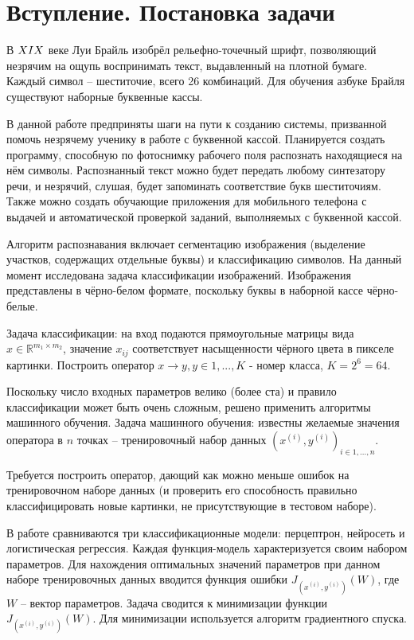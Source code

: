 \documentclass[main.tex]{subfiles}
\begin{document}
\section{Вступление. Постановка задачи}
В $\MakeUppercase{\romannumeral 19}$ веке Луи Брайль изобрёл рельефно-точечный шрифт, позволяющий незрячим на ощупь воспринимать текст, выдавленный на плотной бумаге. Каждый символ – шеститочие, всего 26 комбинаций. Для обучения азбуке Брайля существуют наборные буквенные кассы.

В данной работе предприняты шаги на пути к созданию системы, призванной помочь незрячему ученику в работе с буквенной кассой. Планируется создать программу, способную по фотоснимку рабочего поля распознать находящиеся на нём символы. Распознанный текст можно будет передать любому синтезатору речи, и незрячий, слушая, будет запоминать соответствие букв шеститочиям. Также можно создать обучающие приложения для мобильного телефона с выдачей и автоматической проверкой заданий, выполняемых с буквенной кассой.

Алгоритм распознавания включает сегментацию изображения (выделение участков, содержащих отдельные буквы) и классификацию символов. На данный момент исследована задача классификации изображений. Изображения представлены в чёрно-белом формате, поскольку буквы в наборной кассе чёрно-белые.

Задача классификации: на вход подаются прямоугольные матрицы вида $x \in \mathds{R} ^{m_1\times m_2}$, значение $x_{ij}$ соответствует насыщенности чёрного цвета в пикселе картинки. Построить оператор $x\rightarrow y, y \in 1, ..., K$ - номер класса, $K = 2^6 = 64$.

Поскольку число входных параметров велико (более ста) и правило классификации может быть очень сложным, решено применить алгоритмы машинного обучения. Задача машинного обучения: известны желаемые значения оператора в $n$ точках – тренировочный набор данных $(x^{(i)}, y^{(i)})_{i\in 1,...,n}$.

Требуется построить оператор, дающий как можно меньше ошибок на тренировочном наборе данных (и проверить его способность правильно классифицировать новые картинки, не присутствующие в тестовом наборе).

В работе сравниваются три классификационные модели: перцептрон, нейросеть и логистическая регрессия. Каждая функция-модель характеризуется своим набором параметров. Для нахождения оптимальных значений параметров при данном наборе тренировочных данных вводится функция ошибки $J_{(x^{(i)}, y^{(i)})}(W)$, где $W$ – вектор параметров. Задача сводится к минимизации функции $J_{(x^{(i)}, y^{(i)})}(W)$. Для минимизации используется алгоритм градиентного спуска.
\end{document}
